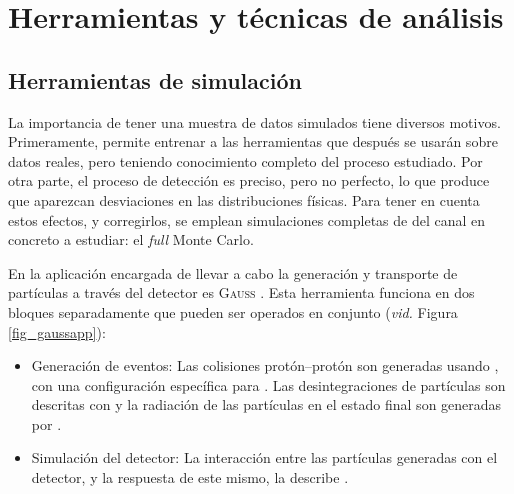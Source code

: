 \chapter{Herramientas y técnicas de análisis}
\label{cha:tools}

\section{Herramientas de simulación}

La importancia de tener una muestra de datos simulados tiene diversos motivos. Primeramente, permite entrenar a las herramientas que después se usarán sobre datos reales, pero teniendo conocimiento completo del proceso estudiado. Por otra parte, el proceso de detección es preciso, pero no perfecto, lo que produce que aparezcan desviaciones en las distribuciones físicas. Para tener en cuenta estos efectos, y corregirlos, se emplean simulaciones completas de \lhcb del canal en concreto a estudiar: el \emph{full} Monte Carlo.

En \lhcb la aplicación \color{dieg} encargada \color{norm} de llevar a cabo la generación y transporte de partículas a través del detector es \textsc{Gauss} \cite{Clemencic_2011}. Esta herramienta funciona en dos bloques separadamente que pueden ser operados en conjunto (\emph{vid.} Figura \ref{fig_gaussapp}):
\begin{itemize}
	\item Generación de eventos: Las colisiones protón--protón son generadas usando \pythia \cite{sjostrand2015introduction}, con una configuración específica para \lhcb. Las desintegraciones de partículas son descritas con \eviltgen \cite{Lange:2001uf} y la radiación de las partículas en el estado final son generadas por \photos \cite{golonka2006photos}.
	\item Simulación del detector: La interacción entre las partículas generadas con el detector, y la respuesta de este mismo, la describe \geant \cite{Agostinelli:2002hh}.
\end{itemize}


